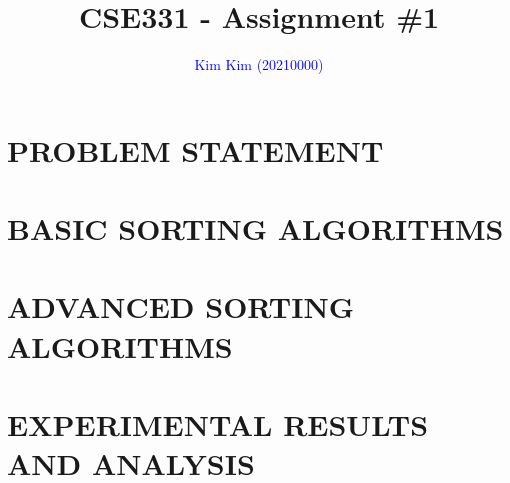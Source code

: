 \documentclass[sigconf]{acmart}
\begin{document}
\title{CSE331 - Assignment \#1}

\author{\textcolor{blue}{Kim Kim (20210000)}}

\renewcommand{\shortauthors}{\textcolor{blue}{Kim et al.}}



\renewcommand\footnotetextcopyrightpermission[1]{} %



\maketitle


\section{PROBLEM STATEMENT}
\lipsum[1]

\section{BASIC SORTING ALGORITHMS}
\lipsum[1]

\section{ADVANCED SORTING ALGORITHMS}
\lipsum[1]

\section{EXPERIMENTAL RESULTS AND ANALYSIS}
\lipsum[1]




\end{document}
